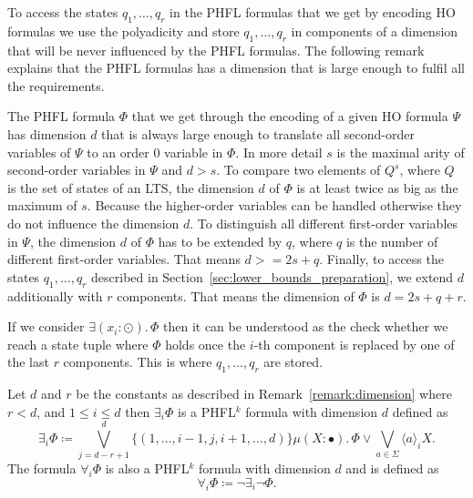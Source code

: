 To access the states $q_1, \dots, q_r$ in the PHFL formulas that we get by encoding HO 
formulas we use the polyadicity and store $q_1, \dots, q_r$ in components of a dimension that 
will be never influenced by the PHFL formulas. The following remark explains that the PHFL 
formulas has a dimension that is large enough to fulfil all the requirements. 

\begin{remark}
\label{remark:dimension}
    The PHFL formula $\Phi$ that we get through the encoding of a given HO formula $\Psi$ has dimension
    $d$ that is always large enough to translate all second-order variables of $\Psi$ to an order $0$ variable in
    $\Phi$. In more detail $s$ is the maximal arity of second-order variables in $\Psi$ and $d > s$. To compare
    two  elements of $Q^{s}$, where $Q$ is the set of states of an LTS, the dimension $d$ of 
    $\Phi$ is at least twice as big as the maximum of $s$. Because the higher-order variables can be handled otherwise they do not influence the dimension $d$. To distinguish all
    different first-order variables in $\Psi$, the dimension $d$ of $\Phi$ has to be extended by $q$, where $q$ is the number of different first-order variables. That means $d >= 2s + q$. Finally, to access the 
    states $q_1, \dots, q_r$ described in Section~\ref{sec:lower_bounds_preparation}, 
    we extend $d$ additionally with $r$ components. That means the dimension of $\Phi$ is $d = 2s + q + r$.
\end{remark}

If we consider $\exists (x_i \colon \odot).\,\Phi$ then it can be understood as the check whether we reach a state tuple where $
\Phi$ holds once the $i$-th component is replaced by one of the last $r$ components. This is where $q_1, \dots, q_r$ are stored.

\begin{definition}
\label{definition:existential_quantification_first}
    Let $d$ and $r$ be the constants as described in Remark~\ref{remark:dimension} where $r < d$, and $1 \leq i \leq d$ then $\exists_i \Phi$ is a PHFL$^k$ formula with dimension $d$ defined as
    \[\exists_i \Phi \coloneqq \bigvee^{d}_{j=d-r+1} \{(1, \dots, i-1, j, i + 1, \dots, d)\} \mu (X
    \colon \bullet).\,\Phi \vee \bigvee_{a \in \Sigma} \langle a \rangle_{i} X.\]
    The formula $\forall_i \Phi$ is also a PHFL$^k$ formula with dimension $d$ and is defined as
    \[\forall_i \Phi \coloneqq \neg \exists_i \neg \Phi.\]
\end{definition}

